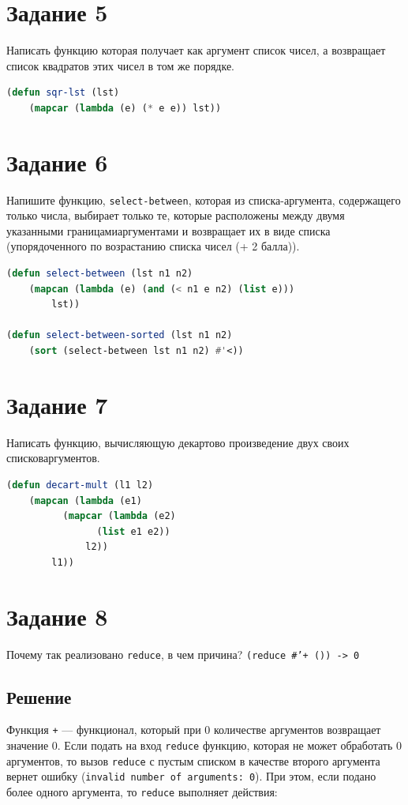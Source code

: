 \documentclass[12pt]{report}
\begin{document}
\section*{Задание 5}
Написать функцию которая получает как аргумент список чисел, а возвращает список квадратов этих чисел в том же порядке.

\begin{lstlisting}[language=Lisp]
(defun sqr-lst (lst)
	(mapcar (lambda (e) (* e e)) lst)) 
\end{lstlisting}


\section*{Задание 6}
Напишите функцию, \texttt{select-between}, которая из списка-аргумента, содержащего только числа, выбирает только те, которые расположены между двумя указанными границамиаргументами и возвращает их в виде списка (упорядоченного по возрастанию списка чисел (+ 2 балла)).

\begin{lstlisting}[language=Lisp]
(defun select-between (lst n1 n2)
	(mapcan (lambda (e) (and (< n1 e n2) (list e)))
		lst))
  
(defun select-between-sorted (lst n1 n2)
	(sort (select-between lst n1 n2) #'<))

\end{lstlisting}






\section*{Задание 7}
Написать функцию, вычисляющую декартово произведение двух своих списковаргументов.


\begin{lstlisting}[language=Lisp]
(defun decart-mult (l1 l2)
	(mapcan (lambda (e1)
		  (mapcar (lambda (e2)
				(list e1 e2))
			  l2))
		l1))
\end{lstlisting}



\section*{Задание 8}
Почему так реализовано \texttt{reduce}, в чем причина? \texttt{(reduce \#'+ ()) -> 0}

\subsection*{Решение}
Функция \texttt{+} --- функционал, который при 0 количестве аргументов возвращает значение 0. Если подать на вход \texttt{reduce} функцию, которая не может обработать 0 аргументов, то вызов \texttt{reduce} с пустым списком в качестве второго аргумента вернет ошибку (\texttt{invalid number of arguments: 0}). При этом, если подано более одного аргумента, то \texttt{reduce} выполняет действия:
\end{document}
